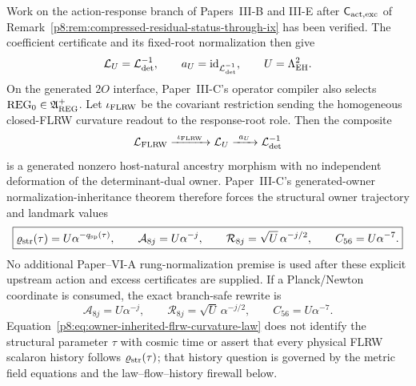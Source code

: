 \documentclass[12pt,a4paper]{article}
\begin{document}
\begin{theorem}
\label{p8:thm:flrw-determinant-owner-inheritance}
Work on the action-response branch of Papers~III-B and III-E after
$\mathsf C_{\rm act,exc}$ of
Remark~\ref{p8:rem:compressed-residual-status-through-ix} has been verified.
The coefficient certificate and its fixed-root normalization then give
\[
 \mathcal L_U=\mathcal L_{\det}^{-1},\qquad
 a_U=\operatorname{id}_{\mathcal L_{\det}^{-1}},\qquad
 U=\Lambda_{\rm EH}^{2}.
\]
On the generated \(2O\) interface, Paper~III-C's operator compiler also
selects \(\mathrm{REG}_0\in\mathfrak A_{\rm REG}^{+}\).  Let
\(\iota_{\rm FLRW}\) be the covariant restriction sending the homogeneous
closed-FLRW curvature readout to the response-root role.  Then the composite
\[
 \mathcal L_{\rm FLRW}
 \xrightarrow{\ \iota_{\rm FLRW}\ }
 \mathcal L_U
 \xrightarrow{\ a_U\ }
 \mathcal L_{\det}^{-1}
\]
is a generated nonzero host-natural ancestry morphism with no independent
deformation of the determinant-dual owner.  Paper~III-C's generated-owner
normalization-inheritance theorem therefore forces the structural owner
trajectory and landmark values
\begin{equation}
\label{p8:eq:owner-inherited-flrw-curvature-law}
 \boxed{
 \varrho_{\rm str}(\tau)=U\alpha^{-q_{\rm sp}(\tau)},\qquad
 \mathcal A_{8j}=U\alpha^{-j},\qquad
 \mathcal R_{8j}=\sqrt U\,\alpha^{-j/2},\qquad
 C_{56}=U\alpha^{-7}.}
\end{equation}
No additional Paper--VI-A rung-normalization premise is used after these
explicit upstream action and excess certificates are supplied.  If a Planck/Newton coordinate is consumed, the exact
branch-safe rewrite is
\[
 \mathcal A_{8j}=U\alpha^{-j},\qquad
 \mathcal R_{8j}=\sqrt{U}\,\alpha^{-j/2},\qquad
 C_{56}=U\alpha^{-7}.
\]
Equation~\eqref{p8:eq:owner-inherited-flrw-curvature-law}
does not identify the structural parameter \(\tau\) with cosmic time or
assert that every physical FLRW scalaron history follows
\(\varrho_{\rm str}(\tau)\); that history question is governed by the metric
field equations and the law--flow--history firewall below.
\end{theorem}
\end{document}
